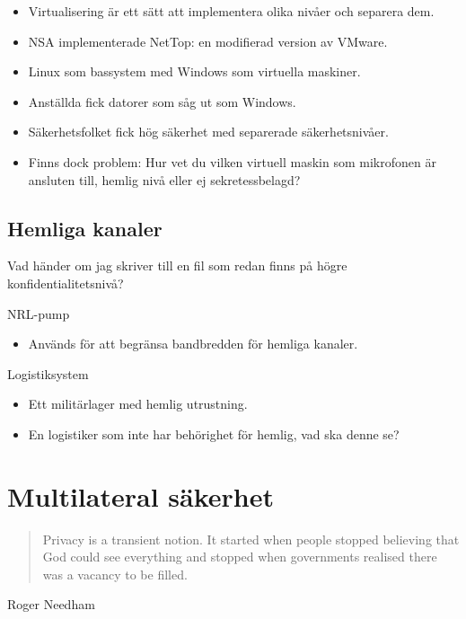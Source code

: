 \begin{frame}{\insertsubsectionhead}
  \begin{itemize}
    \item Virtualisering är ett sätt att implementera olika nivåer och separera 
      dem.
    \item NSA implementerade NetTop: en modifierad version av VMware.
    \item Linux som bassystem med Windows som virtuella maskiner.
    \item Anställda fick datorer som såg ut som Windows.
    \item Säkerhetsfolket fick hög säkerhet med separerade säkerhetsnivåer.
    \item Finns dock problem:
      Hur vet du vilken virtuell maskin som mikrofonen är ansluten till, hemlig 
      nivå eller ej sekretessbelagd?
  \end{itemize}
\end{frame}

\subsection{Hemliga kanaler}
\begin{frame}{\insertsubsectionhead}
  Vad händer om jag skriver till en fil som redan finns på högre 
  konfidentialitetsnivå?
\end{frame}
\begin{frame}{\insertsubsectionhead}{NRL-pump}
  \begin{itemize}
    \item Används för att begränsa bandbredden för hemliga kanaler.
  \end{itemize}
\end{frame}
\begin{frame}{\insertsubsectionhead}{Logistiksystem}
  \begin{itemize}
    \item Ett militärlager med hemlig utrustning.
    \item En logistiker som inte har behörighet för hemlig, vad ska denne se?
  \end{itemize}
\end{frame}


\section{Multilateral säkerhet}
\begin{frame}{\insertsubsectionhead}
  \begin{quote}
    Privacy is a transient notion.
    It started when people stopped believing that God could see everything and 
    stopped when governments realised there was a vacancy to be filled.
  \end{quote}
  \begin{flushright}
    Roger Needham
  \end{flushright}
\end{frame}


